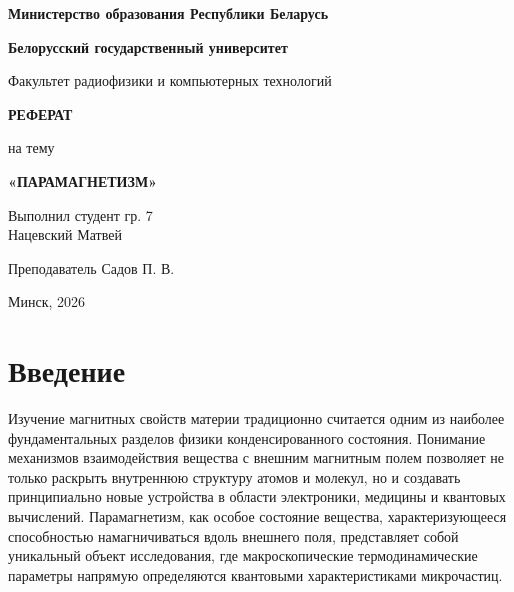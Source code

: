 \documentclass[a4paper,14pt]{extarticle}
\begin{document}
\begin{titlepage}
\begin{center}

\textbf{Министерство образования Республики Беларусь}

\textbf{Белорусский государственный университет}

Факультет радиофизики и компьютерных технологий

\vspace{5cm}

\textbf{РЕФЕРАТ}

\vspace{0.5cm}

на тему

\textbf{«ПАРАМАГНЕТИЗМ»}

\end{center}

\vfill

\begin{flushright}

Выполнил студент гр. 7 \\

Нацевский Матвей

\vspace{0.5cm}

Преподаватель Садов П. В.

\end{flushright}

\vfill

\begin{center}
Минск, 2026
\end{center}

\end{titlepage}

\tableofcontents
\newpage

\section{Введение}

Изучение магнитных свойств материи традиционно считается одним из наиболее фундаментальных разделов физики конденсированного состояния. Понимание механизмов взаимодействия вещества с внешним магнитным полем позволяет не только раскрыть внутреннюю структуру атомов и молекул, но и создавать принципиально новые устройства в области электроники, медицины и квантовых вычислений. Парамагнетизм, как особое состояние вещества, характеризующееся способностью намагничиваться вдоль внешнего поля, представляет собой уникальный объект исследования, где макроскопические термодинамические параметры напрямую определяются квантовыми характеристиками микрочастиц.
\end{document}
